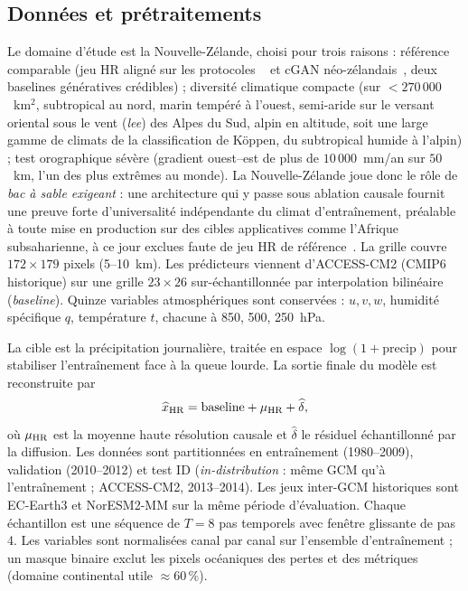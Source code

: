 \subsection{Données et prétraitements}
\label{ssec:exp-env-data}

Le domaine d'étude est la Nouvelle-Zélande, choisi pour trois raisons : référence comparable (jeu HR aligné sur les protocoles \CorrDiff{}~\cite{mardani_corrdiff_2023} et cGAN néo-zélandais~\cite{rampal_cgan_2024}, deux baselines génératives crédibles) ; diversité climatique compacte (sur $<270\,000$~km$^2$, subtropical au nord, marin tempéré à l'ouest, semi-aride sur le versant oriental sous le vent (\emph{lee}) des Alpes du Sud, alpin en altitude, soit une large gamme de climats de la classification de Köppen, du subtropical humide à l'alpin) ; test orographique sévère (gradient ouest--est de plus de $10\,000$~mm/an sur $50$~km, l'un des plus extrêmes au monde). La Nouvelle-Zélande joue donc le rôle de \emph{bac à sable exigeant} : une architecture qui y passe sous ablation causale fournit une preuve forte d'universalité indépendante du climat d'entraînement, préalable à toute mise en production sur des cibles applicatives comme l'Afrique subsaharienne, à ce jour exclues faute de jeu HR de référence~\cite{bachmann_hpc_africa_2025}. La grille \HR{} couvre $172 \times 179$ pixels (5--10~km). Les prédicteurs \LR{} viennent d'ACCESS-CM2 (CMIP6 historique) sur une grille $23 \times 26$ sur-échantillonnée par interpolation bilinéaire (\emph{baseline}). Quinze variables atmosphériques sont conservées : $u, v, w$, humidité spécifique $q$, température $t$, chacune à 850, 500, 250~hPa.

La cible \HR{} est la précipitation journalière, traitée en espace $\log(1 + \mathrm{precip})$ pour stabiliser l'entraînement face à la queue lourde. La sortie finale du modèle est reconstruite par
\begin{equation}
  \widehat{x}_{\text{HR}} = \mathrm{baseline} + \mu_{\text{HR}} + \widehat{\delta},
  \label{eq:exp-decomp}
\end{equation}
où $\mu_{\text{HR}}$ est la moyenne haute résolution causale et $\widehat{\delta}$ le résiduel échantillonné par la diffusion. Les données sont partitionnées en entraînement (1980--2009), validation (2010--2012) et test ID (\emph{in-distribution} : même GCM qu'à l'entraînement ; ACCESS-CM2, 2013--2014). Les jeux inter-GCM historiques sont EC-Earth3 et NorESM2-MM sur la même période d'évaluation. Chaque échantillon est une séquence de $T = 8$ pas temporels avec fenêtre glissante de pas 4. Les variables \LR{} sont normalisées canal par canal sur l'ensemble d'entraînement ; un masque binaire exclut les pixels océaniques des pertes et des métriques (domaine continental utile $\approx 60\,\%$).

